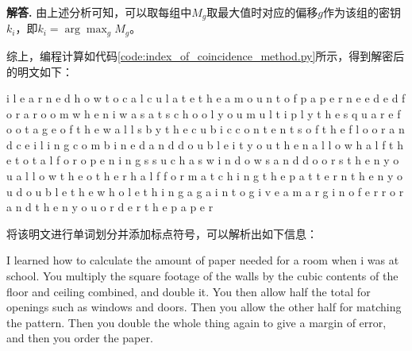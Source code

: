 \documentclass[12pt, a4paper, oneside]{ctexart}
\newenvironment{solution}{\par\noindent\textbf{解答. }}{\par}
\begin{document}
\begin{solution}
		由上述分析可知，可以取每组中$ M_{g} $取最大值时对应的偏移$ g $作为该组的密钥$ k_{i} $，即$ k_{i} = \arg\max_{g} {M_{g}} $。
		
		
		综上，编程计算如代码\ref{code:index_of_coincidence_method.py}所示，得到解密后的明文如下：
		
		\begin{shaded}
			i l e a r n e d h o w t o c a l c u l a t e t h e a m o u n t o f p a p e r n e e d e d f o r a r o o m w h e n i w a s a t s c h o o l y o u m u l t i p l y t h e s q u a r e f o o t a g e o f t h e w a l l s b y t h e c u b i c c o n t e n t s o f t h e f l o o r a n d c e i l i n g c o m b i n e d a n d d o u b l e i t y o u t h e n a l l o w h a l f t h e t o t a l f o r o p e n i n g s s u c h a s w i n d o w s a n d d o o r s t h e n y o u a l l o w t h e o t h e r h a l f f o r m a t c h i n g t h e p a t t e r n t h e n y o u d o u b l e t h e w h o l e t h i n g a g a i n t o g i v e a m a r g i n o f e r r o r a n d t h e n y o u o r d e r t h e p a p e r
		\end{shaded}
		
		将该明文进行单词划分并添加标点符号，可以解析出如下信息：
		
		I learned how to calculate the amount of paper needed for a room when i was at school. You multiply the square footage of the walls by the cubic contents of the floor and ceiling combined, and double it. You then allow half the total for openings such as windows and doors. Then you allow the other half for matching the pattern. Then you double the whole thing again to give a margin of error, and then you order the paper.
		
		
		
		
	\end{solution}
	
\end{document}
